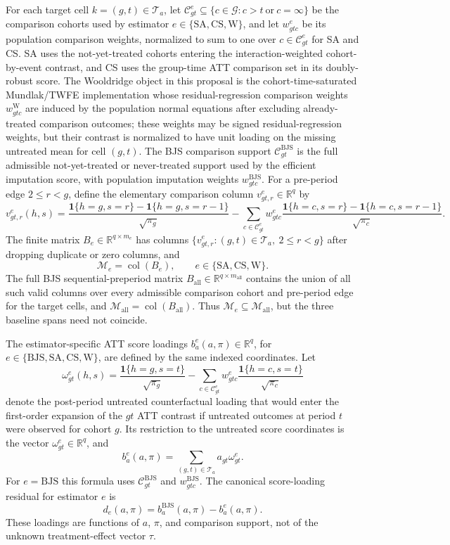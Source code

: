 \documentclass[11pt]{article}
\newcommand{\one}{\mathbf{1}}
\newcommand{\R}{\mathbb{R}}
\theoremstyle{definition}
\theoremstyle{plain}
\theoremstyle{remark}
\begin{document}
For each target cell \(k=(g,t)\in\mathcal T_a\), let
\(\mathcal C^e_{gt}\subseteq\{c\in\mathcal G:c>t\ \text{or}\ c=\infty\}\)
be the comparison cohorts used by estimator
\(e\in\{\mathrm{SA},\mathrm{CS},\mathrm{W}\}\), and let
\(w^e_{gtc}\) be its population comparison weights, normalized to sum to one
over \(c\in\mathcal C^e_{gt}\) for SA and CS.  SA uses the not-yet-treated
cohorts entering the interaction-weighted cohort-by-event contrast, and CS
uses the group-time ATT comparison set in its doubly-robust score.  The
Wooldridge object in this proposal is the cohort-time-saturated
Mundlak/TWFE implementation whose residual-regression comparison weights
\(w^{\mathrm W}_{gtc}\) are induced by the population normal equations after
excluding already-treated comparison outcomes; these weights may be signed
residual-regression weights, but their contrast is normalized to have unit
loading on the missing untreated mean for cell \((g,t)\).  The BJS comparison
support \(\mathcal C^{\mathrm{BJS}}_{gt}\) is the full admissible
not-yet-treated or never-treated support used by the efficient imputation
score, with population imputation weights \(w^{\mathrm{BJS}}_{gtc}\).  For a
pre-period edge \(2\le r<g\), define the elementary comparison column
\(v^e_{gt,r}\in\R^q\) by
\[
  v^e_{gt,r}(h,s)=
  \frac{\one\{h=g,s=r\}-\one\{h=g,s=r-1\}}{\sqrt{\pi_g}}
  -\sum_{c\in\mathcal C^e_{gt}}w^e_{gtc}
   \frac{\one\{h=c,s=r\}-\one\{h=c,s=r-1\}}{\sqrt{\pi_c}}.
\]
The finite matrix \(B_e\in\R^{q\times m_e}\) has columns
\(\{v^e_{gt,r}:(g,t)\in\mathcal T_a,\ 2\le r<g\}\) after dropping duplicate
or zero columns, and
\[
  \mathcal M_e=\operatorname{col}(B_e),\qquad
  e\in\{\mathrm{SA},\mathrm{CS},\mathrm{W}\}.
\]
The full BJS sequential-preperiod matrix
\(B_{\mathrm{all}}\in\R^{q\times m_{\mathrm{all}}}\) contains the union of
all such valid columns over every admissible comparison cohort and pre-period
edge for the target cells, and
\(\mathcal M_{\mathrm{all}}=\operatorname{col}(B_{\mathrm{all}})\).
Thus \(\mathcal M_e\subseteq\mathcal M_{\mathrm{all}}\), but the three
baseline spans need not coincide.

The estimator-specific ATT score loadings \(b_a^e(a,\pi)\in\R^q\), for
\(e\in\{\mathrm{BJS},\mathrm{SA},\mathrm{CS},\mathrm{W}\}\), are defined by
the same indexed coordinates.  Let
\[
  \omega_{gt}^{e}(h,s)=
  \frac{\one\{h=g,s=t\}}{\sqrt{\pi_g}}
  -\sum_{c\in\mathcal C^e_{gt}}w^e_{gtc}
   \frac{\one\{h=c,s=t\}}{\sqrt{\pi_c}}
\]
denote the post-period untreated counterfactual loading that would enter the
first-order expansion of the \(gt\) ATT contrast if untreated outcomes at
period \(t\) were observed for cohort \(g\).  Its restriction to the untreated
score coordinates is the vector \(\omega_{gt}^e\in\R^q\), and
\[
  b_a^e(a,\pi)=\sum_{(g,t)\in\mathcal T_a}a_{gt}\omega_{gt}^{e}.
\]
For \(e=\mathrm{BJS}\) this formula uses
\(\mathcal C^{\mathrm{BJS}}_{gt}\) and \(w^{\mathrm{BJS}}_{gtc}\).  The
canonical score-loading residual for estimator \(e\) is
\[
  d_e(a,\pi)=b_a^{\mathrm{BJS}}(a,\pi)-b_a^e(a,\pi).
\]
These loadings are functions of \(a\), \(\pi\), and comparison support, not of
the unknown treatment-effect vector \(\tau\).
\end{document}
